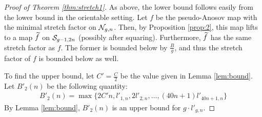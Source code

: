 \begin{proof}[Proof of Theorem \ref{thm:stretch1}]
As above, the lower bound follows easily from the lower bound in the orientable setting.  %
  Let $f$ be the pseudo-Anosov map with the minimal stretch factor on $\mathcal{N}_{g,n}$. Then, by Proposition \ref{prop:2},
  this map lifts to a map $\widetilde{f}$ on $\mathcal{S}_{g-1, 2n}$ (possibly after squaring). Furthermore, $\widetilde{f}$ has the
  same stretch factor as $f$. The former is bounded below by $\frac{B}{g}$, and thus the stretch factor of $f$
  is bounded below as well.
  
  To find the upper bound, let $C'=\frac{C}{2}$ be the value given in Lemma \ref{lem:bound}. Let $B'_2(n)$ be the
  following quantity:
  \begin{align*}
    B'_2(n) = \max\{2C'n, l'_{1,n}, 2l'_{2,n}, \dots, (40n + 1)l'_{40n+1,n}\}
  \end{align*}
  By Lemma \ref{lem:bound}, $B'_2(n)$ is an upper bound for $g\cdot l'_{g,n}$.
\end{proof}
